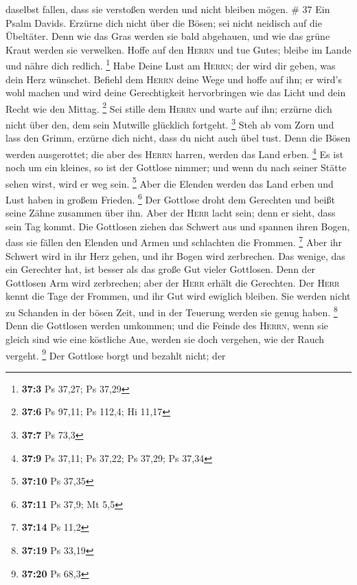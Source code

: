 daselbst fallen, dass sie verstoßen werden und nicht bleiben mögen. \#
37  Ein Psalm Davids. Erzürne dich nicht über die Bösen;
sei nicht neidisch auf die Übeltäter.  Denn wie das Gras
werden sie bald abgehauen, und wie das grüne Kraut werden sie verwelken.
 Hoffe auf den \textsc{Herrn} und tue Gutes; bleibe im
Lande und nähre dich redlich. \footnote{\textbf{37:3} Ps 37,27; Ps 37,29}
 Habe Deine Lust am \textsc{Herrn}; der wird dir geben,
was dein Herz wünschet.  Befiehl dem \textsc{Herrn} deine
Wege und hoffe auf ihn; er wird's wohl machen  und wird
deine Gerechtigkeit hervorbringen wie das Licht und dein Recht wie den
Mittag. \footnote{\textbf{37:6} Ps 97,11; Ps 112,4; Hi 11,17}
 Sei stille dem \textsc{Herrn} und warte auf ihn; erzürne
dich nicht über den, dem sein Mutwille glücklich fortgeht. \footnote{\textbf{37:7}
  Ps 73,3}  Steh ab vom Zorn und lass den Grimm, erzürne
dich nicht, dass du nicht auch übel tust.  Denn die Bösen
werden ausgerottet; die aber des \textsc{Herrn} harren, werden das Land
erben. \footnote{\textbf{37:9} Ps 37,11; Ps 37,22; Ps 37,29; Ps 37,34}
 Es ist noch um ein kleines, so ist der Gottlose nimmer;
und wenn du nach seiner Stätte sehen wirst, wird er weg sein.
\footnote{\textbf{37:10} Ps 37,35}  Aber die Elenden
werden das Land erben und Lust haben in großem Frieden. \footnote{\textbf{37:11}
  Ps 37,9; Mt 5,5}  Der Gottlose droht dem Gerechten und
beißt seine Zähne zusammen über ihn.  Aber der
\textsc{Herr} lacht sein; denn er sieht, dass sein Tag kommt.
 Die Gottlosen ziehen das Schwert aus und spannen ihren
Bogen, dass sie fällen den Elenden und Armen und schlachten die Frommen.
\footnote{\textbf{37:14} Ps 11,2}  Aber ihr Schwert wird
in ihr Herz gehen, und ihr Bogen wird zerbrechen.  Das
wenige, das ein Gerechter hat, ist besser als das große Gut vieler
Gottlosen.  Denn der Gottlosen Arm wird zerbrechen; aber
der \textsc{Herr} erhält die Gerechten.  Der
\textsc{Herr} kennt die Tage der Frommen, und ihr Gut wird ewiglich
bleiben.  Sie werden nicht zu Schanden in der bösen Zeit,
und in der Teuerung werden sie genug haben. \footnote{\textbf{37:19} Ps
  33,19}  Denn die Gottlosen werden umkommen; und die
Feinde des \textsc{Herrn}, wenn sie gleich sind wie eine köstliche Aue,
werden sie doch vergehen, wie der Rauch vergeht. \footnote{\textbf{37:20}
  Ps 68,3}  Der Gottlose borgt und bezahlt nicht; der
